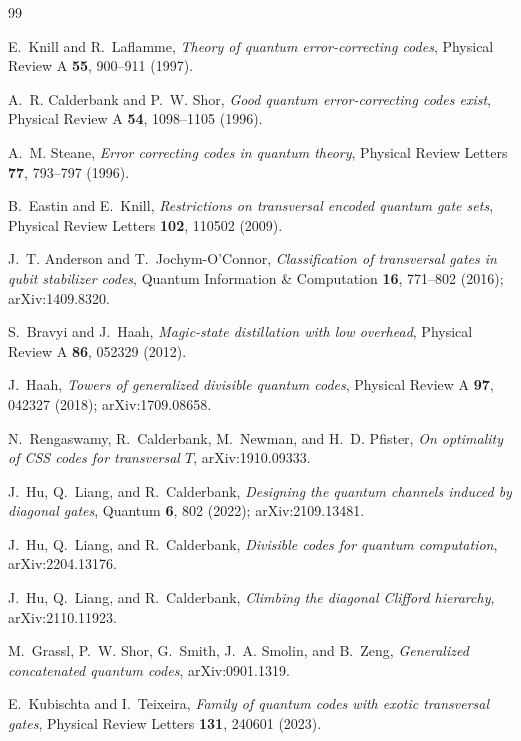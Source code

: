 \documentclass[11pt]{article}
\begin{document}
\begin{thebibliography}{99}

E.~Knill and R.~Laflamme,
\emph{Theory of quantum error-correcting codes},
Physical Review A \textbf{55}, 900--911 (1997).

A.~R. Calderbank and P.~W. Shor,
\emph{Good quantum error-correcting codes exist},
Physical Review A \textbf{54}, 1098--1105 (1996).

A.~M. Steane,
\emph{Error correcting codes in quantum theory},
Physical Review Letters \textbf{77}, 793--797 (1996).

B.~Eastin and E.~Knill,
\emph{Restrictions on transversal encoded quantum gate sets},
Physical Review Letters \textbf{102}, 110502 (2009).

J.~T. Anderson and T.~Jochym-O'Connor,
\emph{Classification of transversal gates in qubit stabilizer codes},
Quantum Information \& Computation \textbf{16}, 771--802 (2016); arXiv:1409.8320.

S.~Bravyi and J.~Haah,
\emph{Magic-state distillation with low overhead},
Physical Review A \textbf{86}, 052329 (2012).

J.~Haah,
\emph{Towers of generalized divisible quantum codes},
Physical Review A \textbf{97}, 042327 (2018); arXiv:1709.08658.

N.~Rengaswamy, R.~Calderbank, M.~Newman, and H.~D. Pfister,
\emph{On optimality of CSS codes for transversal $T$},
arXiv:1910.09333.

J.~Hu, Q.~Liang, and R.~Calderbank,
\emph{Designing the quantum channels induced by diagonal gates},
Quantum \textbf{6}, 802 (2022); arXiv:2109.13481.

J.~Hu, Q.~Liang, and R.~Calderbank,
\emph{Divisible codes for quantum computation},
arXiv:2204.13176.

J.~Hu, Q.~Liang, and R.~Calderbank,
\emph{Climbing the diagonal Clifford hierarchy},
arXiv:2110.11923.

M.~Grassl, P.~W. Shor, G.~Smith, J.~A. Smolin, and B.~Zeng,
\emph{Generalized concatenated quantum codes},
arXiv:0901.1319.

E.~Kubischta and I.~Teixeira,
\emph{Family of quantum codes with exotic transversal gates},
Physical Review Letters \textbf{131}, 240601 (2023).


\end{thebibliography}
\end{document}
